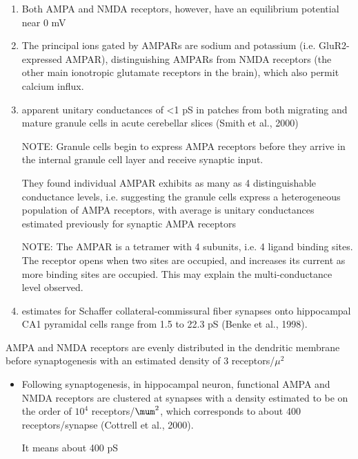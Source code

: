 \begin{enumerate}
  
  \item Both AMPA and NMDA receptors, however, have an equilibrium potential near 0 mV
  
  \item The principal ions gated by AMPARs are sodium and potassium (i.e.
  GluR2-expressed AMPAR), distinguishing AMPARs from NMDA receptors (the other
  main ionotropic glutamate receptors in the brain), which also permit calcium influx.
  
  \item   apparent unitary conductances of <1 pS in patches from both migrating
  and mature granule cells in acute cerebellar slices (Smith et al., 2000)
  
NOTE: Granule cells begin to express AMPA receptors before they arrive in the
internal granule cell layer and receive synaptic input. 

They found individual AMPAR exhibits as many as 4 distinguishable conductance
levels, i.e. suggesting the granule cells express a heterogeneous
population of AMPA receptors, with average is unitary conductances
estimated previously for synaptic AMPA receptors

NOTE: The AMPAR is a tetramer with 4 subunits, i.e. 4 ligand binding sites.
The receptor opens when two sites are occupied, and increases its current as
more binding sites are occupied. This may explain the multi-conductance level
observed.

  \item estimates for Schaffer collateral-commissural fiber synapses onto
  hippocampal CA1 pyramidal cells range from 1.5 to 22.3 pS (Benke et al., 1998).
\end{enumerate}

AMPA and NMDA receptors are evenly distributed in the dendritic membrane before
synaptogenesis with an estimated density of 3 receptors/$\mu^2$
\begin{itemize}
  
  \item Following synaptogenesis, in hippocampal neuron, functional AMPA and
  NMDA receptors are clustered at synapses with a density estimated to be on the
  order of $10^4$ receptors/$\mum^2$, which corresponds to about 400
  receptors/synapse (Cottrell et al., 2000).
  
 It means about 400 pS  
\end{itemize}



